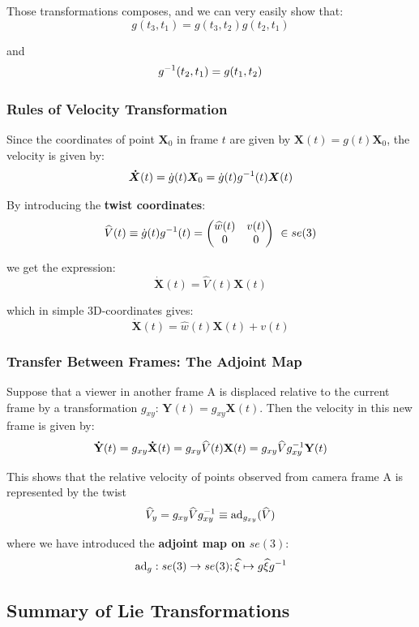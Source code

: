Those transformations composes, and we can very easily show that:
	\[g(t_3,t_1) = g(t_3,t_2) g(t_2,t_1)\]

and
	\[g^{-1}(t_2,t_1) = g(t_1,t_2)\]


\subsubsection{Rules of Velocity Transformation}%
\label{ssub:rules_of_velocity_transformation}

Since the coordinates of point $\bm{X}_0$ in frame $t$ are given by
$\bm{X}(t) = g(t) \bm{X}_0$, the velocity is given by:
	\[\bm{\dot{X}}(t) = \dot{g}(t)\bm{X}_0 = \dot{g}(t)g^{-1}(t) \bm{X}(t)\]

By introducing the \textbf{twist coordinates}:
	\[\widehat{V}(t) \equiv \dot{g}(t)g^{-1}(t) = \begin{pmatrix}
		\widehat{w}(t) & v(t) \\
		0 & 0 \\
	\end{pmatrix}\ \in se(3)\]

we get the expression:
	\[\boxed{\bm{\dot{X}}(t) = \widehat{V}(t)\bm{X}(t)}\]

which in simple 3D-coordinates gives:
	\[\bm{\dot{X}}(t) = \widehat{w}(t)\bm{X}(t) + v(t)\]


\subsubsection{Transfer Between Frames: The Adjoint Map}%
\label{ssub:transfer_between_frames_the_adjoint_map}

Suppose that a viewer in another frame A is displaced relative to the current frame
by a transformation $g_{xy}$: $\mathbf{Y}(t) = g_{xy} \mathbf{X}(t)$.
Then the velocity in this new frame is given by:
\[\mathbf{\dot{Y}}(t)
	= g_{xy} \mathbf{\dot{X}}(t)
	= g_{xy} \widehat{V}(t) \mathbf{X}(t)
	= g_{xy} \widehat{V} g_{xy}^{-1} \mathbf{Y}(t)\]

This shows that the relative velocity of points observed from camera frame A
is represented by the twist
\[\widehat{V}_y = g_{xy} \widehat{V} g_{xy}^{-1}
	\equiv \text{ad}_{g_{xy}}(\widehat{V})\]

where we have introduced the \textbf{adjoint map on $se(3)$}:
\[\text{ad}_g : se(3) \rightarrow se(3);
	\widehat{\xi} \mapsto g \widehat{\xi} g^{-1}\]


\subsection{Summary of Lie Transformations}%
\label{sub:summary_of_lie_transformations}


